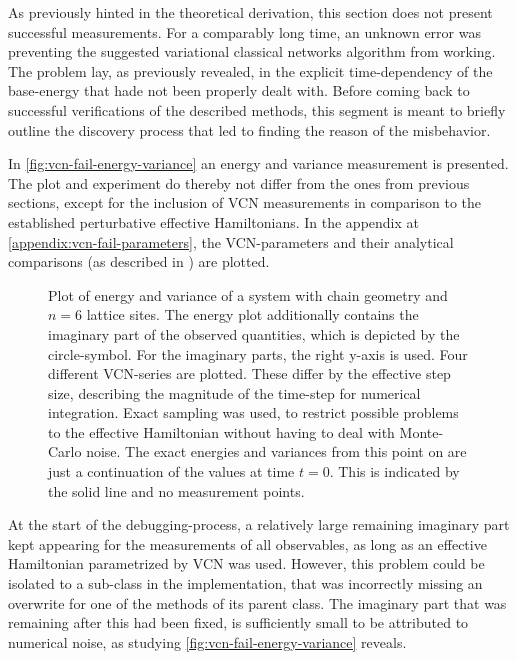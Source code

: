 As previously hinted in the theoretical derivation, this section does not present successful measurements.
For a comparably long time, an unknown error was preventing the suggested variational classical networks algorithm from working.
The problem lay, as previously revealed, in the explicit time-dependency of the base-energy that hade not been properly dealt with.
Before coming back to successful verifications of the described methods, this segment is meant to briefly outline the discovery process that led to finding the reason of the misbehavior.

In \autoref{fig:vcn-fail-energy-variance} an energy and variance measurement is presented. 
The plot and experiment do thereby not differ from the ones from previous sections, except for the inclusion of VCN measurements in comparison to the established perturbative effective Hamiltonians.
In the appendix at \ref{appendix:vcn-fail-parameters}, the VCN-parameters and their analytical comparisons (as described in ) are plotted.

\begin{figure}[htbp]
    \centering
    \vspace{-0.5cm}
    \caption{
            Plot of energy and variance of a system with chain geometry and $n=6$ lattice sites.
            The energy plot additionally contains the imaginary part of the observed quantities, which is depicted by the circle-symbol.
            For the imaginary parts, the right y-axis is used.
            Four different VCN-series are plotted. These differ by the effective step size, describing the magnitude of the time-step for numerical integration.
            Exact sampling was used, to restrict possible problems to the effective Hamiltonian without having to deal with Monte-Carlo noise.
            The exact energies and variances from this point on are just a continuation of the values at time $t=0$. This is indicated by the solid line and no measurement points.
        }
    \label{fig:vcn-fail-energy-variance}
\end{figure}

At the start of the debugging-process, a relatively large remaining imaginary part kept appearing for the measurements of all observables, as long as an effective Hamiltonian parametrized by VCN was used.
However, this problem could be isolated to a sub-class in the implementation, that was incorrectly missing an overwrite for one of the methods of its parent class.
The imaginary part that was remaining after this had been fixed, is sufficiently small to be attributed to numerical noise, as studying \autoref{fig:vcn-fail-energy-variance} reveals.

